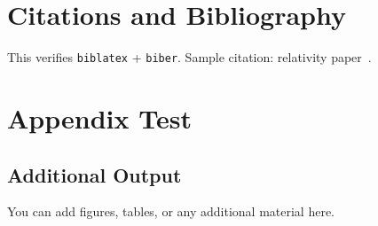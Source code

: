 \documentclass[12pt]{article}
\theoremstyle{plain}
\theoremstyle{definition}
\theoremstyle{remark}
\numberwithin{equation}{section}
\begin{document}
\section{Citations and Bibliography}
This verifies \texttt{biblatex} + \texttt{biber}.
Sample citation: relativity paper~\cite{einstein1905}.

\printbibliography

\section{Appendix Test}
\begin{appendices}
\section{Additional Output}
You can add figures, tables, or any additional material here.
\end{appendices}
\end{document}

